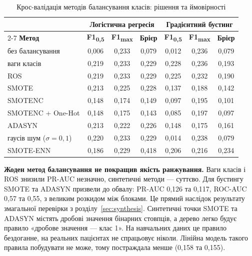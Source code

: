 \documentclass[14pt,a4paper]{extreport}
\begin{document}
\begin{table}[H]
\caption{Крос-валідація методів балансування класів: рішення та ймовірності}
\label{tab:cv_decisions}
\small
\renewcommand{\arraystretch}{1.15}
\begin{tabularx}{\linewidth}{|X|c|c|c|c|c|c|}
\hline
 & \multicolumn{3}{c|}{\textbf{Логістична регресія}} & \multicolumn{3}{c|}{\textbf{Градієнтний бустинг}} \\
\cline{2-7}
\textbf{Метод} & \textbf{F1\textsubscript{0,5}} & \textbf{F1\textsubscript{max}} & \textbf{Брієр} & \textbf{F1\textsubscript{0,5}} & \textbf{F1\textsubscript{max}} & \textbf{Брієр} \\
\hline
без балансування & 0,006 & 0,233 & 0,079 & 0,012 & 0,236 & 0,079 \\
\hline
ваги класів & 0,219 & 0,233 & 0,229 & 0,228 & 0,236 & 0,193 \\
\hline
ROS & 0,219 & 0,233 & 0,229 & 0,225 & 0,232 & 0,190 \\
\hline
SMOTE & 0,213 & 0,225 & 0,228 & 0,137 & 0,188 & 0,142 \\
\hline
SMOTENC & 0,148 & 0,174 & 0,149 & 0,097 & 0,195 & 0,101 \\
\hline
SMOTENC + One-Hot & 0,148 & 0,175 & 0,143 & 0,085 & 0,197 & 0,097 \\
\hline
ADASYN & 0,213 & 0,222 & 0,226 & 0,148 & 0,175 & 0,161 \\
\hline
гаусів шум ($\sigma = 0{,}1$) & 0,220 & 0,233 & 0,229 & 0,014 & 0,238 & 0,079 \\
\hline
SMOTE-ENN & 0,186 & 0,229 & 0,418 & 0,206 & 0,216 & 0,234 \\
\hline
\end{tabularx}
\end{table}

\textbf{Жоден метод балансування не покращив якість ранжування.} Ваги класів і ROS знизили PR-AUC незначно, синтетичні методи --- суттєво. Для бустингу SMOTE та ADASYN призвели до обвалу: PR-AUC 0,126 та 0,117, ROC-AUC 0,57 та 0,55, з великим розкидом між блоками. Це прямий наслідок результату змагальної перевірки з розділу~\ref{sec:synthesis}. Синтетичні точки SMOTE та ADASYN містять дробові значення бінарних стовпців, а дерево легко будує правило «дробове значення --- клас 1». На навчальних даних це правило бездоганне, на реальних пацієнтах не спрацьовує ніколи. Лінійна модель такого правила побудувати не може, тому постраждала менше (0,158 та 0,155).
\end{document}
